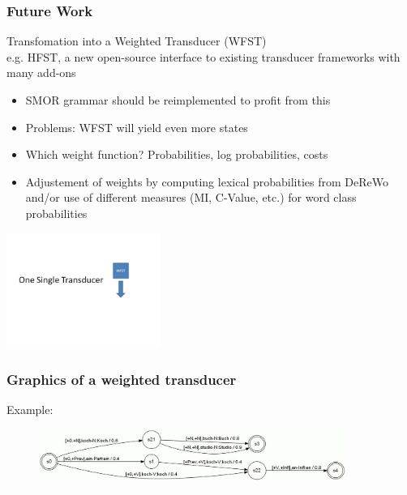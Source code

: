 \documentclass {beamer}
\begin{document}
\frame
{  \frametitle{Future Work}

Transfomation into a Weighted Transducer (WFST) \\
e.g. HFST, a new open-source interface to existing transducer frameworks with many add-ons  \\
\begin{itemize} 
\item SMOR grammar should be reimplemented to profit from this
\item Problems: WFST will yield even more states
\item Which weight function? Probabilities, log probabilities, costs
\item Adjustement of weights by computing lexical probabilities from DeReWo and/or use of different measures (MI, C-Value, etc.) for word class probabilities
 \end{itemize}
 \includegraphics[width=5cm] {Single2.jpg}
}

\frame
{  \frametitle{Graphics of a weighted transducer}
Example:
\begin{figure}[hp]
	\centering
		\includegraphics[width=10cm]{graph13.jpg}
	\label{fig:graph13}
\end{figure}
}
\end{document}
